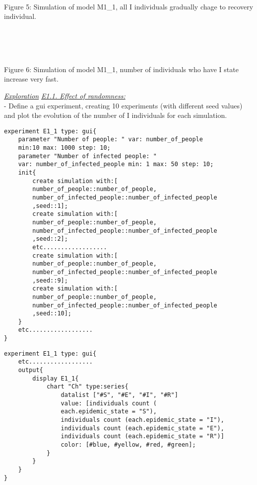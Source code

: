 \documentclass{article}
\begin{document}
\\\\
\begin{pic5}
\\
\caption{Figure 5: Simulation of model M1\_1, all I individuals gradually chage to recovery individual.}
\end{pic5}
\\\\
\begin{pic6}
\\
\caption{Figure 6: Simulation of model M1\_1, number of individuals who have I state increase very fast.}
\end{pic6}
\newpage
\underline{\emph{Exploration}}
\newline\newline
\underline{\textit{E1.1. Effect of randomness:}}
\\
- Define a gui experiment, creating 10 experiments (with different seed values) and plot the evolution of the number of I individuals for each simulation.
\newline\newline
\begin{tcolorbox}
\begin{lstlisting}
experiment E1_1 type: gui{
	parameter "Number of people: " var: number_of_people 
	min:10 max: 1000 step: 10;
	parameter "Number of infected people: " 
	var: number_of_infected_people min: 1 max: 50 step: 10;
	init{
		create simulation with:[
		number_of_people::number_of_people,
		number_of_infected_people::number_of_infected_people
		,seed::1];
		create simulation with:[
		number_of_people::number_of_people,
		number_of_infected_people::number_of_infected_people
		,seed::2];
		etc..................
		create simulation with:[
		number_of_people::number_of_people,
		number_of_infected_people::number_of_infected_people
		,seed::9];
		create simulation with:[
		number_of_people::number_of_people,
		number_of_infected_people::number_of_infected_people
		,seed::10];
	}
	etc..................
}
\end{lstlisting}
\end{tcolorbox}
\newpage
\begin{tcolorbox}
\begin{lstlisting}
experiment E1_1 type: gui{
	etc..................
	output{
		display E1_1{
			chart "Ch" type:series{
				datalist ["#S", "#E", "#I", "#R"] 
				value: [individuals count (
				each.epidemic_state = "S"), 		
				individuals count (each.epidemic_state = "I"),			
				individuals count (each.epidemic_state = "E"), 				
				individuals count (each.epidemic_state = "R")] 
				color: [#blue, #yellow, #red, #green]; 			  
			}
		}
	}
}
\end{lstlisting}
\end{tcolorbox}
\end{document}
